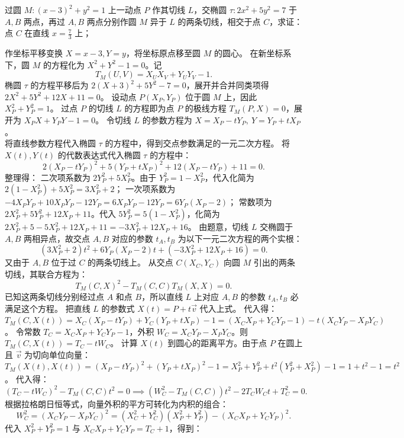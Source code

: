 \begin{example}
过圆 $M: (x-3)^2 + y^2 = 1$ 上一动点 $P$ 作其切线 $L$，交椭圆 $\tau: 2x^2 + 5y^2 = 7$ 于 $A,B$ 两点，再过 $A,B$ 两点分别作圆 $M$ 异于 $L$ 的两条切线，相交于点 $C$，求证：点 $C$ 在直线 $x = \frac{7}{3}$ 上；
\end{example}
\begin{solution}
作坐标平移变换 $X = x - 3, Y = y$，将坐标原点移至圆 $M$ 的圆心。
在新坐标系下，圆 $M$ 的方程化为 $X^2 + Y^2 - 1 = 0$。记
\[
T_M(U,V) = X_U X_V + Y_U Y_V - 1.
\]
椭圆 $\tau$ 的方程平移后为 $2(X+3)^2 + 5Y^2 - 7 = 0$，展开并合并同类项得 $2X^2 + 5Y^2 + 12X + 11 = 0$。
设动点 $P(X_P, Y_P)$ 位于圆 $M$ 上，因此 $X_P^2 + Y_P^2 = 1$。
过点 $P$ 的切线 $L$ 的方程即为点 $P$ 的极线方程 $T_M(P,X) = 0$，展开为 $X_P X + Y_P Y - 1 = 0$。
令切线 $L$ 的参数方程为 $X = X_P - tY_P,\ Y = Y_P + tX_P$。\\
将直线参数方程代入椭圆 $\tau$ 的方程中，得到交点参数满足的一元二次方程。
将 $X(t), Y(t)$ 的代数表达式代入椭圆 $\tau$ 的方程中：
\[ 2(X_P - tY_P)^2 + 5(Y_P + tX_P)^2 + 12(X_P - tY_P) + 11 = 0. \]
整理得：
二次项系数为 $2Y_P^2 + 5X_P^2$。由于 $Y_P^2 = 1 - X_P^2$，代入化简为 $2(1-X_P^2) + 5X_P^2 = 3X_P^2 + 2$；
一次项系数为 $-4X_P Y_P + 10X_P Y_P - 12Y_P = 6X_P Y_P - 12Y_P = 6Y_P(X_P - 2)$；
常数项为 $2X_P^2 + 5Y_P^2 + 12X_P + 11$。代入 $5Y_P^2 = 5(1-X_P^2)$，化简为 $2X_P^2 + 5 - 5X_P^2 + 12X_P + 11 = -3X_P^2 + 12X_P + 16$。
由题意，切线 $L$ 交椭圆于 $A, B$ 两相异点，故交点 $A, B$ 对应的参数 $t_A, t_B$ 为以下一元二次方程的两个实根：
\[ (3X_P^2 + 2)t^2 + 6Y_P(X_P - 2)t + (-3X_P^2 + 12X_P + 16) = 0. \]
又由于 $A,B$ 位于过 $C$ 的两条切线上。
从交点 $C(X_C, Y_C)$ 向圆 $M$ 引出的两条切线，其联合方程为：
\[ T_M(C,X)^2 - T_M(C,C)T_M(X,X) = 0. \]
已知这两条切线分别经过点 $A$ 和点 $B$，所以直线 $L$ 上对应 $A, B$ 的参数 $t_A, t_B$ 必满足这个方程。
把直线 $L$ 的参数式 $X(t) = P + t\vec{v}$ 代入上式。
代入得：
$T_M(C, X(t)) = X_C(X_P - tY_P) + Y_C(Y_P + tX_P) - 1 = (X_C X_P + Y_C Y_P - 1) - t(X_C Y_P - X_P Y_C)$。
令常数 $T_C = X_C X_P + Y_C Y_P - 1$，外积 $W_C = X_C Y_P - X_P Y_C$。则 $T_M(C, X(t)) = T_C - t W_C$。
计算 $X(t)$ 到圆心的距离平方。由于点 $P$ 在圆上且 $\vec{v}$ 为切向单位向量：
$T_M(X(t), X(t)) = (X_P - tY_P)^2 + (Y_P + tX_P)^2 - 1 = X_P^2 + Y_P^2 + t^2(Y_P^2 + X_P^2) - 1 = 1 + t^2 - 1 = t^2$。
代入得：
\[ (T_C - t W_C)^2 - T_M(C,C)t^2 = 0 \implies (W_C^2 - T_M(C,C))t^2 - 2T_C W_C t + T_C^2 = 0. \]
根据拉格朗日恒等式，向量外积的平方可转化为内积的组合：
\[ W_C^2 = (X_C Y_P - X_P Y_C)^2 = (X_C^2 + Y_C^2)(X_P^2 + Y_P^2) - (X_C X_P + Y_C Y_P)^2. \]
代入 $X_P^2 + Y_P^2 = 1$ 与 $X_C X_P + Y_C Y_P = T_C + 1$，得到：

\end{solution}
